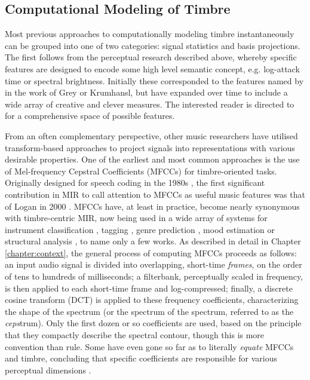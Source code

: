 \subsection{Computational Modeling of Timbre}
Most previous approaches to computationally modeling timbre instantaneously can be grouped into one of two categories: signal statistics and basis projections.
The first follows from the perceptual research described above, whereby specific features are designed to encode some high level semantic concept, e.g. log-attack time or spectral brightness.
Initially these corresponded to the features named by in the work of Grey or Krumhansl, but have expanded over time to include a wide array of creative and clever measures.
The interested reader is directed to \cite{Essid2006Musical} for a comprehensive space of possible features.

From an often complementary perspective, other music researchers have utilised transform-based approaches to project signals into representations with various desirable properties.
One of the earliest and most common approaches is the use of Mel-frequency Cepstral Coefficients (MFCCs) for timbre-oriented tasks.
Originally designed for speech coding in the 1980s \cite{Mermelstein1980Comparison}, the first significant contribution in MIR to call attention to MFCCs as useful music features was that of Logan in 2000 \cite{Logan2000Mel}.
MFCCs have, at least in practice, become nearly synonymous with timbre-centric MIR, now being used in a wide array of systems for instrument classification \cite{Herrera2003Automatic}, tagging \cite{Barrington2008Combining}, genre prediction \cite{Tzanetakis2002Musical}, mood estimation \cite{Schmidt2010Prediction} or structural analysis \cite{Paulus2010State}, to name only a few works.
As described in detail in Chapter \ref{chapter:context}, the general process of computing MFCCs proceeds as follows: an input audio signal is divided into overlapping, short-time \emph{frames}, on the order of tens to hundreds of milliseconds; a filterbank, perceptually scaled in frequency, is then applied to each short-time frame and log-compressed; finally, a discrete cosine transform (DCT) is applied to these frequency coefficients, characterizing the shape of the spectrum (or the spectrum of the spectrum, referred to as the \emph{ceps}trum).
Only the first dozen or so coefficients are used, based on the principle that they compactly describe the spectral contour, though this is more convention than rule.
Some have even gone so far as to literally \emph{equate} MFCCs and timbre, concluding that specific coefficients are responsible for various perceptual dimensions \cite{Terasawa2005Thirteen}.

